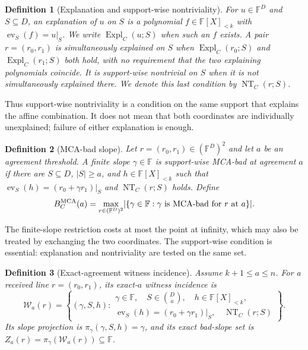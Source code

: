 \documentclass[12pt,a4paper]{amsart}
\numberwithin{equation}{section}
\newtheorem{definition}[definition]{Definition}
\theoremstyle{remark}
\newcommand{\F}{\mathbb F}
\newcommand{\Wcal}{\mathcal W}
\newcommand{\abs}[1]{\lvert #1\rvert}
\begin{document}
\begin{definition}[Explanation and support-wise nontriviality]
\label{def:explanation}
For \(u\in\F^D\) and \(S\subseteq D\), an \emph{explanation of \(u\) on
\(S\)} is a polynomial \(f\in\F[X]_{<k}\) with
\(\operatorname{ev}_S(f)=u|_S\).  We write
\(\operatorname{Expl}_C(u;S)\) when such an \(f\) exists.  A pair
\(r=(r_0,r_1)\) is \emph{simultaneously explained on \(S\)} when
\(\operatorname{Expl}_C(r_0;S)\) and
\(\operatorname{Expl}_C(r_1;S)\) both hold, with no requirement that the
two explaining polynomials coincide.  It is \emph{support-wise
nontrivial on \(S\)} when it is not simultaneously explained there.
We denote this last condition by \(\operatorname{NT}_C(r;S)\).
\end{definition}

Thus support-wise nontriviality is a condition on the same support that
explains the affine combination.  It does not mean that both coordinates
are individually unexplained; failure of either explanation is enough.

\begin{definition}[MCA-bad slope]\label{def:mca-bad}
Let \(r=(r_0,r_1)\in(\F^D)^2\) and let \(a\) be an agreement threshold.
A finite slope \(\gamma\in\F\) is support-wise MCA-bad at agreement \(a\)
if there are \(S\subseteq D\), \(\abs S\ge a\), and
\(h\in\F[X]_{<k}\) such that
\(\operatorname{ev}_S(h)=(r_0+\gamma r_1)|_S\) and
\(\operatorname{NT}_C(r;S)\) holds.  Define
\[
        B_C^{\rm MCA}(a)
        =\max_{r\in(\F^D)^2}\abs{\{\gamma\in\F:
          \gamma\text{ is MCA-bad for }r\text{ at }a\}}.
\]
\end{definition}

The finite-slope restriction costs at most the point at infinity, which may
also be treated by exchanging the two coordinates.  The support-wise
condition is essential: explanation and nontriviality are tested on the
same set.

\begin{definition}[Exact-agreement witness incidence]
\label{def:exact-witness-incidence}
Assume \(k+1\le a\le n\).  For a received line \(r=(r_0,r_1)\), its
exact-\(a\) witness incidence is
\[
 \Wcal_a(r)=\left\{(\gamma,S,h):
 \begin{array}{l}
   \gamma\in\F,\quad S\in\binom Da,\quad h\in\F[X]_{<k},\\
   \operatorname{ev}_S(h)=(r_0+\gamma r_1)|_S,\quad
   \operatorname{NT}_C(r;S)
 \end{array}\right\}.
 \tag{2.1}\label{eq:exact-witness-incidence}
\]
Its slope projection is
\(\pi_\gamma(\gamma,S,h)=\gamma\), and its exact bad-slope set is
\(Z_a(r)=\pi_\gamma(\Wcal_a(r))\subseteq\F\).
\end{definition}
\end{document}
